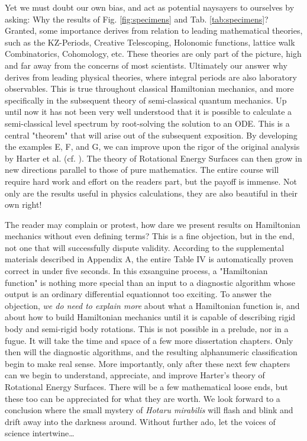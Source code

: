 \documentclass[nofootinbib,preprint]{revtex4-1}
\begin{document}
Yet we must doubt our own bias, and act as potential naysayers to ourselves by 
asking: Why the results of Fig. \ref{fig:specimens} and Tab. \ref{tab:specimens}? Granted, some 
importance derives from relation to leading mathematical theories, such as the KZ-Periods, Creative 
Telescoping, Holonomic functions, lattice walk Combinatorics, Cohomology, etc. These theories are 
only part of the picture, high and far away from the concerns of most scientists. Ultimately our answer why 
derives from leading physical theories, where integral periods are also laboratory observables. 
This is true throughout classical Hamiltonian mechanics, and more specifically in the subsequent theory
of semi-classical quantum mechanics. Up until now it has not been very well understood that it is 
possible to calculate a semi-classical level spectrum by root-solving the solution to an ODE. This 
is a central "theorem" that will arise out of the subsequent exposition. By developing the examples 
E, F, and G, we can improve upon the rigor of the original analysis by Harter et al. 
(cf. \cite{HP1984,HW1989,HARTER2006}). The theory of Rotational Energy Surfaces can then
grow in new directions parallel to those of pure mathematics. The entire course will require 
hard work and effort on the readers part, but the payoff is immense. Not only are the results 
useful in physics calculations, they are also beautiful in their own right!

The reader may complain or protest, how dare we present results on Hamiltonian mechanics 
without even defining terms? This is a fine objection, but in the end, not one that will
successfully dispute validity. According to the supplemental materials described in Appendix A, 
the entire Table IV is automatically proven correct in under five seconds. In this exsanguine 
process, a "Hamiltonian function" is nothing more special than an input to a diagnostic algorithm 
whose output is an ordinary differential equation\textemdash not too exciting. To answer the 
objection, \textit{we do need to explain more} about what a Hamiltonian function is, and about
how to build Hamiltonian mechanics until it is capable of describing rigid body and semi-rigid 
body rotations. This is not possible in a prelude, nor in a fugue.  It will take the time and 
space of a few more dissertation chapters.  Only then will the diagnostic algorithms, and the 
resulting alphanumeric classification begin to make real sense. More importantly, only after 
these next few chapters can we begin to understand, appreciate, and improve Harter's theory 
of Rotational Energy Surfaces. There will be a few mathematical loose ends, but these too
can be appreciated for what they are worth. We look forward to a conclusion where the small 
mystery of \textit{Hotaru mirabilis} will flash and blink and drift away 
into the darkness around. Without further ado, let the voices of science intertwine\ldots
\pagebreak 
\end{document}
